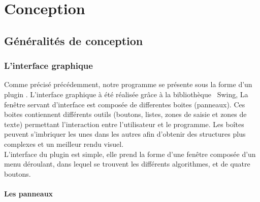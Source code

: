 \chapter{Conception}

\section{Généralités de conception}
\subsection{L'interface graphique}
Comme précisé précédemment, notre programme se présente sous la forme d'un plugin \imj . L'interface graphique à été réalisée grâce à la bibliothèque  \java ~Swing, %
La fenêtre servant d'interface est composée de differentes boites (panneaux). Ces boites contiennent différents outils (boutons, listes, zones de saisie et zones de texte) permettant l'interaction entre l'utilisateur et le programme. Les boîtes peuvent s'imbriquer les unes dans les autres afin d'obtenir des structures plus complexes et un meilleur rendu visuel. \\
L'interface du plugin est simple, elle prend la forme d'une fenêtre composée d'un menu déroulant, dans lequel se trouvent les différents algorithmes, et de quatre boutons. \\

\subsubsection{Les panneaux}

